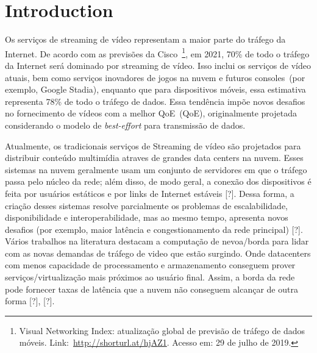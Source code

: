 \section{Introduction}
\label{ch:introduction}



Os serviços de streaming de vídeo representam a maior parte do tráfego da Internet. De acordo com as previsões da Cisco~\footnote{Visual Networking Index: atualização global de previsão de tráfego de dados móveis. Link:~\url{http://shorturl.at/hjAZ1}. Acesso em: 29 de julho de 2019.}, em 2021, 70\% de todo o tráfego da Internet será dominado por streaming de vídeo. Isso inclui os serviços de vídeo atuais, bem como serviços inovadores de jogos na nuvem e futuros consoles~(por exemplo, Google Stadia), enquanto que para dispositivos móveis, essa estimativa representa 78\% de todo o tráfego de dados. Essa tendência impõe novos desafios no fornecimento de vídeos com a melhor \acl{QoE}~(QoE), originalmente projetada considerando o modelo de \textit{best-effort} para transmissão de dados.

Atualmente, os tradicionais serviços de Streaming de vídeo são projetados para distribuir conteúdo multimídia atraves de grandes data centers na nuvem. Esses sistemas na nuvem geralmente usam um conjunto de servidores em que o tráfego passa pelo núcleo da rede; além disso, de modo geral, a conexão dos dispositivos é feita por usuários estáticos e por links de Internet estáveis [?]. Dessa forma, a criação desses sistemas resolve parcialmente os problemas de escalabilidade, disponibilidade e interoperabilidade, mas ao mesmo tempo, apresenta novos desafios (por exemplo, maior latência e congestionamento da rede principal) [?]. Vários trabalhos na literatura destacam a computação de nevoa/borda para lidar com as novas demandas de tráfego de video que estão surgindo. Onde datacenters com menos capacidade de processamento e armazenamento conseguem prover serviços/virtualização mais próximos ao usuário final. Assim, a borda da rede pode fornecer taxas de latência que a nuvem não conseguem alcançar de outra forma [?], [?].

